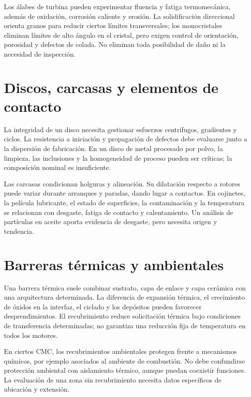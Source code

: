 Los álabes de turbina pueden experimentar fluencia y fatiga termomecánica, además de oxidación, corrosión caliente y erosión. La solidificación direccional orienta granos para reducir ciertos límites transversales; los monocristales eliminan límites de alto ángulo en el cristal, pero exigen control de orientación, porosidad y defectos de colada. No eliminan toda posibilidad de daño ni la necesidad de inspección.
\section{Discos, carcasas y elementos de contacto}
La integridad de un disco necesita gestionar esfuerzos centrífugos, gradientes y ciclos. La resistencia a iniciación y propagación de defectos debe evaluarse junto a la dispersión de fabricación. En un disco de metal procesado por polvo, la limpieza, las inclusiones y la homogeneidad de proceso pueden ser críticas; la composición nominal es insuficiente.

Las carcasas condicionan holguras y alineación. Su dilatación respecto a rotores puede variar durante arranques y paradas, dando lugar a contactos. En cojinetes, la película lubricante, el estado de superficies, la contaminación y la temperatura se relacionan con desgaste, fatiga de contacto y calentamiento. Un análisis de partículas en aceite aporta evidencia de desgaste, pero necesita origen y tendencia.
\section{Barreras térmicas y ambientales}
Una barrera térmica suele combinar sustrato, capa de enlace y capa cerámica con una arquitectura determinada. La diferencia de expansión térmica, el crecimiento de óxidos en la interfaz, el ciclado y los depósitos pueden favorecer desprendimientos. El recubrimiento reduce solicitación térmica bajo condiciones de transferencia determinadas; no garantiza una reducción fija de temperatura en todos los motores.

En ciertos CMC, los recubrimientos ambientales protegen frente a mecanismos químicos, por ejemplo asociados al ambiente de combustión. No debe confundirse protección ambiental con aislamiento térmico, aunque puedan coexistir funciones. La evaluación de una zona sin recubrimiento necesita datos específicos de ubicación y extensión.
